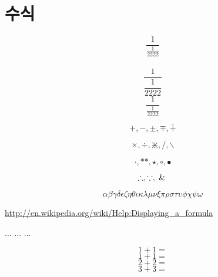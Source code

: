 \documentclass[12pt,a4paper,oneside]{book}
\begin{document}
		

		
		\newpage
		\chapter{수식}
		\newpage  \null
		
						
		\setlength{\belowdisplayskip}{0pt} \setlength{\belowdisplayshortskip}{0pt}
		\setlength{\abovedisplayskip}{0pt} \setlength{\abovedisplayshortskip}{0pt}
		
		\setlength{\abovedisplayskip}{0.0em}
		\setlength{\belowdisplayskip}{0.0em}
		\setlength{\abovedisplayshortskip}{0.1em}
		\setlength{\belowdisplayshortskip}{0.1em} 
		
		
		$$ \frac{1}{\frac{1}{2222}} $$\\[-2.0em]
		$$ \dfrac{1}{\dfrac{1}{2222}} $$
		$$ \frac{1}{\tfrac{1}{2222}} $$
		
		$$+, -, \pm, \mp, \dotplus$$
		
		$$\times, \div, \divideontimes, /, \backslash$$
		
		$$\cdot, * \ast, \star, \circ, \bullet$$
		
		$$\therefore, \because, \And$$
		
		$$ \alpha \beta \gamma \delta \epsilon \zeta
			\eta \theta \iota \kappa \lambda \mu \nu
			\xi  \pi \rho \sigma 
			\tau \upsilon \phi \chi \psi \omega $$
			
		\url{http://en.wikipedia.org/wiki/Help:Displaying_a_formula}
		

		\begin{math} . . . \end{math}
		\( . . . \)
		$ . . . $
		

		\begin{displaymath}
		1+1=
		\end{displaymath}
		\begin{displaymath} 1+1= \end{displaymath}
		\[ 2+2= \]
		$$ 3+3= $$
		 
	
\end{document}
